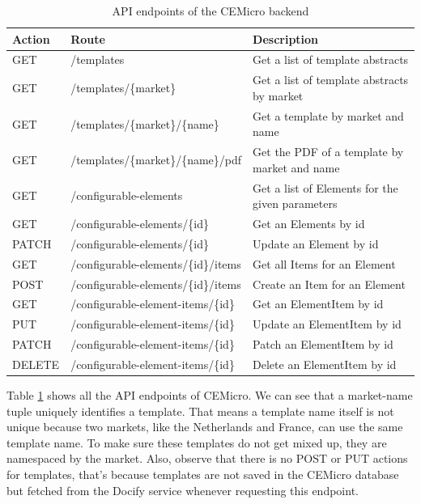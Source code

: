 \begin{table}[!ht]
  \begin{center}
    \begin{tabular}{|l|l|p{6cm}|}
      \hline
      Action & Route & Description \\
      \hline\hline
      GET & /templates & Get a list of template abstracts \\
      \hline
      GET & /templates/\{market\} & Get a list of template abstracts by market \\
      \hline
      GET & /templates/\{market\}/\{name\} & Get a template by market and name \\
      \hline
      GET & /templates/\{market\}/\{name\}/pdf & Get the PDF of a template by market and name \\
      \hline
      GET & /configurable-elements & Get a list of Elements for the given parameters \\
      \hline
      GET & /configurable-elements/\{id\} & Get an Elements by id \\
      \hline
      PATCH & /configurable-elements/\{id\} & Update an Element by id \\
      \hline
      GET & /configurable-elements/\{id\}/items & Get all Items for an Element \\
      \hline
      POST & /configurable-elements/\{id\}/items & Create an Item for an Element \\
      \hline
      GET & /configurable-element-items/\{id\} & Get an ElementItem by id \\
      \hline
      PUT & /configurable-element-items/\{id\} & Update an ElementItem by id \\
      \hline
      PATCH & /configurable-element-items/\{id\} & Patch an ElementItem by id \\
      \hline
      DELETE & /configurable-element-items/\{id\} & Delete an ElementItem by id \\
      \hline
    \end{tabular}
  \end{center}
  \caption{API endpoints of the CEMicro backend}
  \label{table:api-endpoints}
\end{table}

Table \ref{table:api-endpoints} shows all the API endpoints of CEMicro. We can see that a market-name tuple uniquely identifies a template. That means a template name itself is not unique because two markets, like the Netherlands and France, can use the same template name. To make sure these templates do not get mixed up, they are namespaced by the market. Also, observe that there is no POST or PUT actions for templates, that's because templates are not saved in the CEMicro database but fetched from the Docify service whenever requesting this endpoint.


